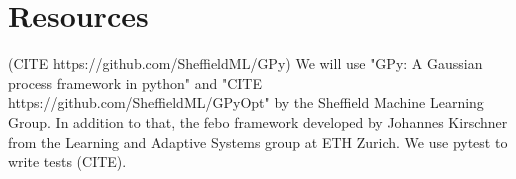 \section{Resources}
(CITE https://github.com/SheffieldML/GPy)
We will use "GPy: A Gaussian process framework in python" and "CITE https://github.com/SheffieldML/GPyOpt" by the Sheffield Machine Learning Group.
In addition to that, the febo framework developed by Johannes Kirschner from the Learning and Adaptive Systems group at ETH Zurich.
We use pytest to write tests (CITE).

